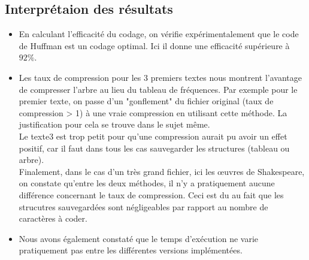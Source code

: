 \documentclass[a4paper,11pt]{article}
\begin{document}
\subsection{Interprétaion des résultats}
\begin{itemize}
	\item En calculant l'efficacité du codage, on vérifie expérimentalement que le code de Huffman est un codage optimal. Ici il donne une efficacité supérieure à $92\%$.
	\item Les taux de compression pour les 3 premiers textes nous montrent l'avantage de compresser l'arbre au lieu du tableau de fréquences. Par exemple pour le premier texte, on passe d'un "gonflement" du fichier original (taux de compression > 1) à une vraie compression en utilisant cette méthode. La justification pour cela se trouve dans le sujet même. \\
		Le texte3 est trop petit pour qu'une compression aurait pu avoir un effet positif, car il faut dans tous les cas sauvegarder les structures (tableau ou arbre).\\
		Finalement, dans le cas d'un très grand fichier, ici les \oe{}uvres de Shakespeare, on constate qu'entre les deux méthodes, il n'y a pratiquement aucune différence concernant le taux de compression. Ceci est du au fait que les strucutres sauvegardées sont négligeables par rapport au nombre de caractères à coder.
	\item Nous avons également constaté que le temps d'exécution ne varie pratiquement pas entre les différentes versions implémentées.

\end{itemize}
\end{document}
